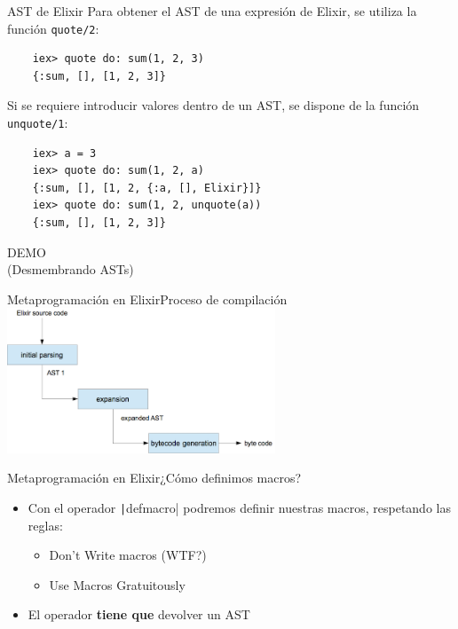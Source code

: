 \documentclass[14pt,aspectratio=169]{beamer}
\begin{document}
\begin{frame}[fragile]{AST de Elixir}
  Para obtener el AST de una expresión de Elixir, se utiliza la función
  \texttt{quote/2}:
  \footnotesize  \begin{verbatim}
    iex> quote do: sum(1, 2, 3)
    {:sum, [], [1, 2, 3]}
  \end{verbatim}
  \normalsize Si se requiere introducir valores dentro de un AST, se dispone de la función
  \texttt{unquote/1}:
  \footnotesize \begin{verbatim}
    iex> a = 3
    iex> quote do: sum(1, 2, a)
    {:sum, [], [1, 2, {:a, [], Elixir}]}
    iex> quote do: sum(1, 2, unquote(a))
    {:sum, [], [1, 2, 3]}
  \end{verbatim}
\end{frame}

\begin{frame}
  \centering
  \huge
  DEMO\\
  \large
  (Desmembrando ASTs)
\end{frame}

\begin{frame}{Metaprogramación en Elixir}{Proceso de compilación}
  \centering
  \includegraphics[width=0.6\textwidth]{compilation_process.png}
\end{frame}

\begin{frame}{Metaprogramación en Elixir}{¿Cómo definimos macros?}
  \begin{itemize}
    \item Con el operador \texttt|defmacro| podremos definir
    nuestras macros, respetando las reglas\footnotemark:
    \begin{itemize}
      \item Don't Write macros (WTF?)
      \item Use Macros Gratuitously
    \end{itemize}
    \item El operador \textbf{tiene que} devolver un AST
  \end{itemize}
\end{frame}
\end{document}

